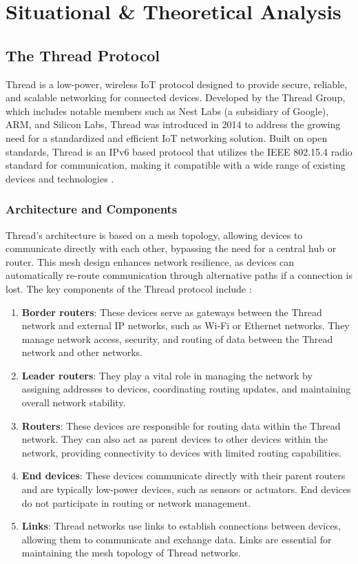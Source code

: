 \chapter{Situational \& Theoretical Analysis}\label{chap:situational_theoretical_analysis}

\section{The Thread Protocol}\label{sec:the_thread_protocol}
Thread is a low-power, wireless \gls{IoT} protocol designed to provide secure, reliable, and scalable networking for connected devices. Developed by the Thread Group, which includes notable members such as Nest Labs (a subsidiary of Google), ARM, and Silicon Labs, Thread was introduced in 2014 to address the growing need for a standardized and efficient \gls{IoT} networking solution. Built on open standards, Thread is an \gls{IPv6} based protocol that utilizes the \gls{IEEE} 802.15.4 radio standard for communication, making it compatible with a wide range of existing devices and technologies \cite{Thread_Group_Fundamentals}.


\subsection{Architecture and Components}
Thread's architecture is based on a mesh topology, allowing devices to communicate directly with each other, bypassing the need for a central hub or router. This mesh design enhances network resilience, as devices can automatically re-route communication through alternative paths if a connection is lost. The key components of the Thread protocol include \cite{Thread_Group_Fundamentals}:

\begin{enumerate}
    \item \textbf{Border routers}: These devices serve as gateways between the Thread network and external \gls{IP} networks, such as Wi-Fi or Ethernet networks. They manage network access, security, and routing of data between the Thread network and other networks.
    \item \textbf{Leader routers}: They play a vital role in managing the network by assigning addresses to devices, coordinating routing updates, and maintaining overall network stability.
    \item \textbf{Routers}: These devices are responsible for routing data within the Thread network. They can also act as parent devices to other devices within the network, providing connectivity to devices with limited routing capabilities.
    \item \textbf{End devices}: These devices communicate directly with their parent routers and are typically low-power devices, such as sensors or actuators. End devices do not participate in routing or network management.
    \item \textbf{Links}: Thread networks use links to establish connections between devices, allowing them to communicate and exchange data. Links are essential for maintaining the mesh topology of Thread networks.
\end{enumerate}

